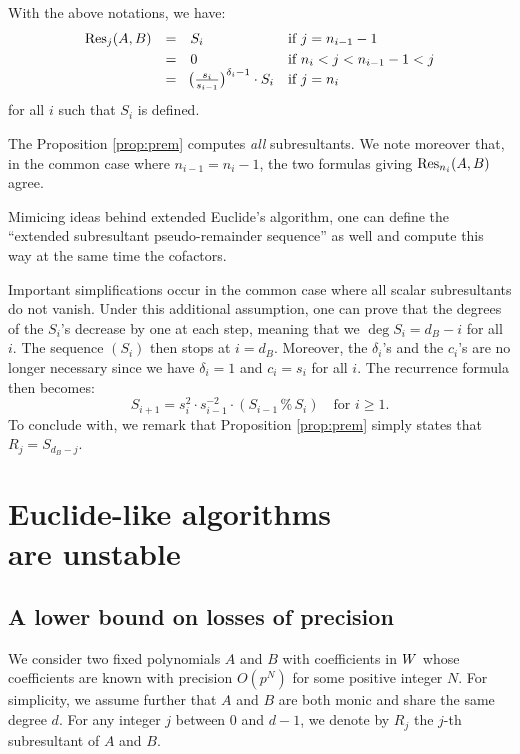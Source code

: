 \documentclass{sig-alternate}
\begin{document}
\begin{prop}
\label{prop:prem}
With the above notations, we have:
$$\begin{array}{rcll}
\Res_j(A,B) & = & S_i & \text{if } j = n_{i-1} - 1 \smallskip \\
& = & 0 & \text{if } n_i < j < n_{i-1} - 1 < j \\
& = & \!\big(\frac{s_i}{s_{i-1}}\big)^{\delta_i-1} \cdot S_i & 
\text{if } j = n_i
\end{array}$$
for all $i$ such that $S_i$ is defined.
\end{prop}

\begin{rem}
The Proposition \ref{prop:prem} computes \emph{all} subresultants. We
note moreover that, in the common case where $n_{i-1} = n_i - 1$, the
two formulas giving $\text{\rm Res}_{n_i}(A,B)$ agree.

Mimicing ideas behind extended Euclide's algorithm, one can define the 
``extended subresultant pseudo-remainder sequence'' as well and compute
this way at the same time the cofactors.
\end{rem}

Important simplifications occur in the common case where all scalar 
subresultants do not vanish. Under this additional assumption, one can 
prove that the degrees of the $S_i$'s decrease by one at each step, 
meaning that we $\deg S_i = d_B - i$ for all $i$. The sequence 
$(S_i)$ then stops at $i = d_B$. Moreover, the $\delta_i$'s and the 
$c_i$'s are no longer necessary since we have $\delta_i = 1$ and $c_i
= s_i$ for all $i$. The recurrence formula then becomes:
$$S_{i+1} = s_i^2 \cdot s_{i-1}^{-2}
\cdot (S_{i-1} \,\%\, S_i) \quad \text{for } i \geq 1.$$
To conclude with, we remark that Proposition \ref{prop:prem} simply 
states that $R_j = S_{d_B-j}$.

\section{Euclide-like algorithms\\are unstable}
\label{sec:unstable}


\subsection{A lower bound on losses of precision}

We consider two fixed polynomials $A$ and $B$ with coefficients in $W$ 
whose coefficients are known with precision $O(p^N)$ for some positive
integer $N$. For simplicity, we assume further that $A$ and $B$ are both
monic and share the same degree $d$. 
For any integer $j$ between $0$ and $d-1$, we denote by $R_j$ the $j$-th 
subresultant of $A$ and $B$.
\end{document}
